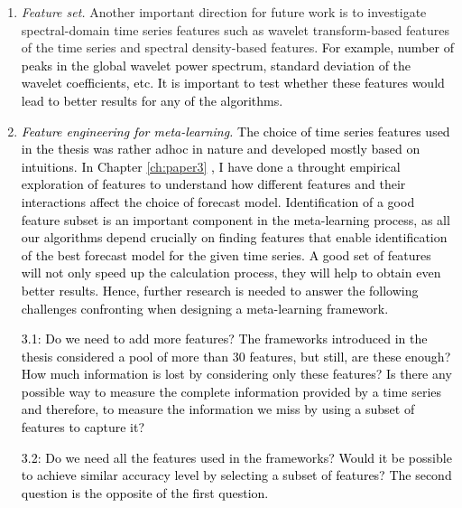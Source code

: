 \documentclass{monashthesis}
\begin{document}
\begin{enumerate}
\def\labelenumi{\arabic{enumi}.}
\setcounter{enumi}{1}
\item
  \emph{Feature set.} Another important direction for future work is to investigate spectral-domain time series features such as wavelet transform-based features of the time series and spectral density-based features. \textcolor{black}{For example, number of peaks in the global wavelet power spectrum, standard deviation of the wavelet coefficients, etc. It is important to test whether these features would lead to better results for any of the algorithms.}
\item
  \textcolor{black}{\textit{Feature engineering for meta-learning.} The choice of time series features used in the thesis was rather adhoc in nature and developed mostly based on intuitions.} \textcolor{black}{In Chapter} \ref{ch:paper3} \textcolor{black}{, I have done a throught empirical exploration of features to understand how different features and their interactions affect the choice of forecast model.  Identification of a good feature subset is an important component in the meta-learning process, as all our algorithms depend crucially on finding features that enable identification of the best forecast model for the given time series.  A good set of features will not only speed up the calculation process, they will help to obtain even better results. Hence, further research is needed to answer the following challenges confronting when designing a meta-learning framework.}

  \textcolor{black}{3.1: Do we need to add more features? The frameworks introduced in the thesis considered a pool of more than 30 features, but still,  are these enough? How much information is lost by considering only these features? Is there any possible way to measure the complete information provided by a time series and therefore, to measure the information we miss by using a subset of features to capture it?}

  \textcolor{black}{ 3.2: Do we need all the features used in the frameworks? Would it be possible to achieve similar accuracy level by selecting a subset of features? The second question is the opposite of the first question.}


\end{enumerate}
\end{document}
